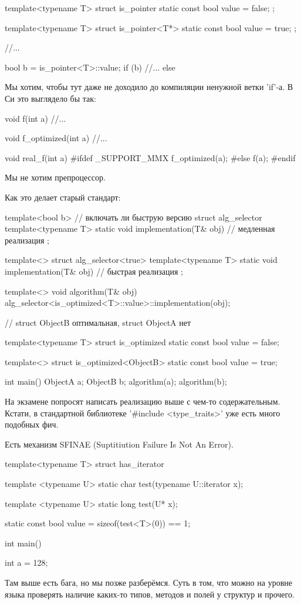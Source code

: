 \begin{cppcode}
template<typename T>
struct is_pointer {
	static const bool value = false;
};

template<typename T>
struct is_pointer<T*> {
	static const bool value = true;
};

//...

bool b = is_pointer<T>::value;
if (b) {
	//...
}
else {

}
\end{cppcode}
Мы хотим, чтобы тут даже не доходило до компиляции ненужной ветки \cpp'if'-а.
В Си это выглядело бы так:
\begin{cppcode}
void f(int a) {
	//...
}

void f_optimized(int a) {
	//...
}

void real_f(int a) {
	#ifdef _SUPPORT_MMX
		f_optimized(a);
	#else
		f(a);
	#endif
}
\end{cppcode}
Мы не хотим препроцессор.

Как это делает старый стандарт:
\begin{cppcode}
template<bool b> // включать ли быструю версию
struct alg_selector {
	template<typename T>
	static void implementation(T& obj) {
		// медленная реализация
	}
};

template<>
struct alg_selector<true> {
	template<typename T>
	static void implementation(T& obj) {
		// быстрая реализация
	}
};

template<>
void algorithm(T& obj) {
	alg_selector<is_optimized<T>::value>::implementation(obj);
}

// struct ObjectB оптимальная, struct ObjectA нет

template<typename T>
struct is_optimized {
	static const bool value = false;
}

template<>
struct is_optimized<ObjectB> {
	static const bool value = true;
}

int main() {
	ObjectA a;
	ObjectB b;
	algorithm(a);
	algorithm(b);
}
\end{cppcode}

На экзамене попросят написать реализацию выше с чем-то содержательным.
Кстати, в стандартной библиотеке \cpp'#include <type_traits>' уже есть много подобных фич.

Есть механизм SFINAE (Suptitiution Failure Is Not An Error).
\begin{cppcode}
template<typename T>
struct has_iterator {
	template <typename U>
	static char test(typename U::iterator x);

	template <typename U>
	static long test(U* x);

	static const bool value = sizeof(test<T>(0)) == 1;
}

int main() {
	int a = 128;

}
\end{cppcode}
Там выше есть бага, но мы позже разберёмся.
Суть в том, что можно на уровне языка проверять наличие каких-то типов, методов и полей у структур  и прочего.

